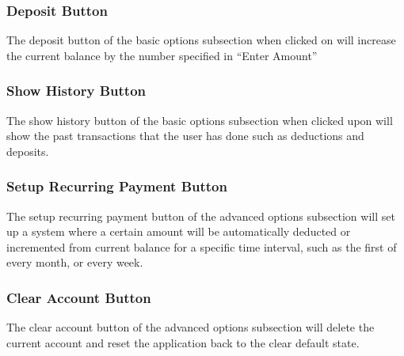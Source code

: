 \documentclass[12pt]{article}
\begin{document}

\subsubsection{Deposit Button}

The deposit button of the basic options subsection when clicked on will increase the current balance by the number specified in “Enter Amount”


\subsubsection{Show History Button}
The show history button of the basic options subsection when clicked upon will show the past transactions that the user has done such as deductions and deposits.


\subsubsection{Setup Recurring Payment Button}
The setup recurring payment button of the advanced options subsection will set up a system where a certain amount will be automatically deducted or incremented from current balance for a specific time interval, such as the first of every month, or every week.


\subsubsection{Clear Account Button}
The clear account button of the advanced options subsection will delete the current account and reset the application back to the clear default state.
\end{document}
